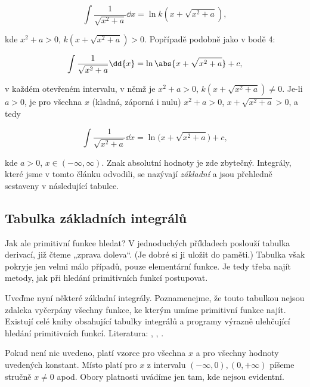 \begin{enumerate}
\begin{fleqn}[\parindent]
\begin{equation*}
                \int\dfrac{1}{\sqrt{x^2+a}}\dd{x} = \ln k(x+\sqrt{x^2+a}),
              \end{equation*}
            \end{fleqn}
            kde \(x^2+a>0\), \(k(x+\sqrt{x^2+a})>0\). Popřípadě podobně jako v bodě 4:
            \begin{fleqn}[\parindent]
              \begin{equation*}
                \int\dfrac{1}{\sqrt{x^2+a}}\dd{x} = \ln\abs{x+\sqrt{x^2+a}} + c,
              \end{equation*}
            \end{fleqn}
            v každém otevřeném intervalu, v němž je \(x^2+a>0\), \(k(x+\sqrt{x^2+a})\neq0\). Je-li
            \(a>0\), je pro všechna \(x\) (kladná, záporná i nulu) \(x^2+a>0\),
            \(x+\sqrt{x^2+a}>0\), a tedy
            \begin{fleqn}[\parindent]
              \begin{equation*}
                \int\dfrac{1}{\sqrt{x^2+a}}\dd{x} = \ln \bigl(x+\sqrt{x^2+a}\bigr) + c,
              \end{equation*}
            \end{fleqn}
            kde \(a>0\), \(x\in(-\infty, \infty)\). Znak absolutní hodnoty je zde zbytečný.
            Integrály, které jsme v tomto článku odvodili, se nazývají \emph{základní} a jsou
            přehledně sestaveny v následující tabulce.
    \end{enumerate}
  
    \subsection{Tabulka základních integrálů}\label{mai:IchapVIIsecIIssecI}
      Jak ale primitivní funkce hledat? V jednoduchých příkladech poslouží tabulka derivací, již
      čteme „zprava doleva“. (Je dobré si ji uložit do paměti.) Tabulka však pokryje jen velmi málo
      případů, pouze elementární funkce. Je tedy třeba najít metody, jak při hledání primitivních
      funkcí postupovat.

      Uveďme nyní některé základní integrály. Poznamenejme, že touto tabulkou nejsou zdaleka
      vyčerpány všechny funkce, ke kterým umíme primitivní funkce najít. Existují celé knihy
      obsahující tabulky integrálů a programy výrazně ulehčující hledání primitivních funkcí.
      Literatura: \cite{Rektorys1963}, \cite{Brabec1989}, \cite{diblik2002}. 

      Pokud není nic uvedeno, platí vzorce pro všechna \(x\) a pro všechny hodnoty uvedených
      konstant. Místo platí pro \(x\) z intervalu \((-\infty,0),(0,+\infty)\) píšeme stručně
      \(x\neq0\) apod. Obory platnosti uvádíme jen tam, kde nejsou evidentní.  


